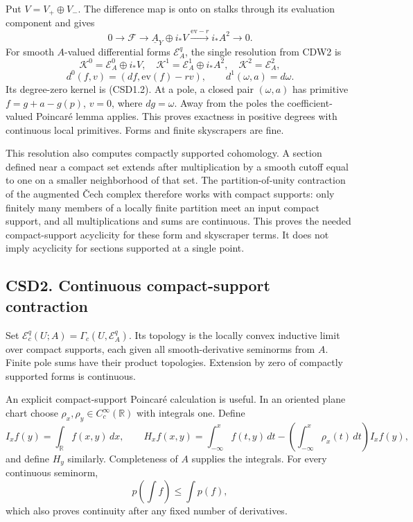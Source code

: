 Put \(V=V_+\oplus V_-\). The difference map is onto on stalks through
its evaluation component and gives \[
0\to\mathscr F\to\underline A_Y\oplus i_*V
\xrightarrow{\mathrm{ev}-r}i_*A^2\to0.
\tag{CSD1.3}
\] For smooth \(A\)-valued differential forms \(\mathscr E_A^q\), the
single resolution from CDW2 is \[
\mathscr K^0=\mathscr E_A^0\oplus i_*V,\quad
\mathscr K^1=\mathscr E_A^1\oplus i_*A^2,\quad
\mathscr K^2=\mathscr E_A^2,
\] \[
d^0(f,v)=(df,\mathrm{ev}(f)-rv),\qquad d^1(\omega,a)=d\omega.
\tag{CSD1.4}
\] Its degree-zero kernel is (CSD1.2). At a pole, a closed pair
\((\omega,a)\) has primitive \(f=g+a-g(p)\), \(v=0\), where
\(dg=\omega\). Away from the poles the coefficient-valued Poincaré lemma
applies. This proves exactness in positive degrees with continuous local
primitives. Forms and finite skyscrapers are fine.

This resolution also computes compactly supported cohomology. A section
defined near a compact set extends after multiplication by a smooth
cutoff equal to one on a smaller neighborhood of that set. The
partition-of-unity contraction of the augmented Čech complex therefore
works with compact supports: only finitely many members of a locally
finite partition meet an input compact support, and all multiplications
and sums are continuous. This proves the needed compact-support
acyclicity for these form and skyscraper terms. It does not imply
acyclicity for sections supported at a single point.

\subsection{CSD2. Continuous compact-support
contraction}\label{csd2.-continuous-compact-support-contraction}

Set \(\mathcal E_c^q(U;A)=\Gamma_c(U,\mathscr E_A^q)\). Its topology is
the locally convex inductive limit over compact supports, each given all
smooth-derivative seminorms from \(A\). Finite pole sums have their
product topologies. Extension by zero of compactly supported forms is
continuous.

An explicit compact-support Poincaré calculation is useful. In an
oriented plane chart choose \(\rho_x,\rho_y\in C_c^\infty(\mathbb R)\)
with integrals one. Define \[
I_x f(y)=\int_{\mathbb R}f(x,y)\,dx,\qquad
H_x f(x,y)=\int_{-\infty}^x f(t,y)\,dt
-\left(\int_{-\infty}^x\rho_x(t)\,dt\right)I_x f(y),
\tag{CSD2.1}
\] and define \(H_y\) similarly. Completeness of \(A\) supplies the
integrals. For every continuous seminorm, \[
p\!\left(\int f\right)\le\int p(f),
\tag{CSD2.2}
\] which also proves continuity after any fixed number of derivatives.

